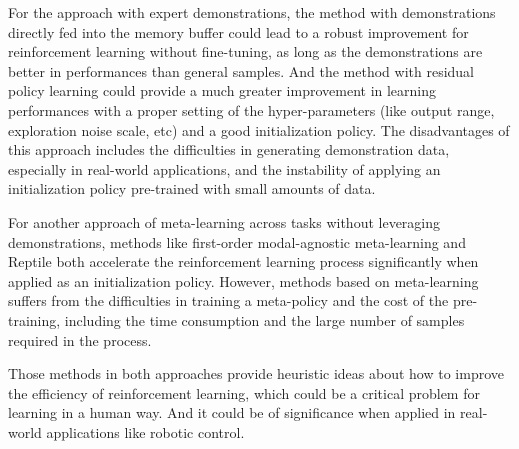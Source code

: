 \documentclass{article}
\begin{document}
For the approach with expert demonstrations, the method with demonstrations directly fed into the memory buffer could lead to a robust improvement for reinforcement learning without fine-tuning, as long as the demonstrations are better in performances than general samples. And the method with residual policy learning could provide a much greater improvement in learning performances with a proper setting of the hyper-parameters (like output range, exploration noise scale, etc) and a good initialization policy. The disadvantages of this approach includes the difficulties in generating demonstration data, especially in real-world applications, and the instability of applying an initialization policy pre-trained with small amounts of data. 

For another approach of meta-learning across tasks without leveraging demonstrations, methods like first-order modal-agnostic meta-learning and Reptile both accelerate the reinforcement learning process significantly when applied as an initialization policy. However, methods based on meta-learning suffers from the difficulties in training a meta-policy and the cost of the pre-training, including the time consumption and the large number of samples required in the process. 

Those methods in both approaches provide heuristic ideas about how to improve the efficiency of reinforcement learning, which could be a critical problem for learning in a human way. And it could be of significance when applied in real-world applications like robotic control.  


\newpage
\medskip
 


\end{document}
